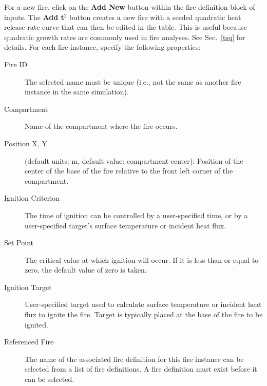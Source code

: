 {{For a new fire, click on the {\bf Add New} button within the fire definition block of inputs. The {\bf Add t$^2$} button creates a new fire with a seeded quadratic heat release rate curve that can then be edited in the table. This is useful because quadratic growth rates are commonly used in fire analyses. See Sec.~\ref{tsq} for details. For each fire instance, specify the following properties:
\begin{description}
\item[Fire ID] The selected name must be unique (i.e., not the same as another fire instance in the same simulation).
\item[Compartment] Name of the compartment where the fire occurs.
\item[Position X, Y] (default units: \unit{m}, default value: compartment center): Position of the center of the base of the fire relative to the front left corner of the compartment.
\item[Ignition Criterion] The time of ignition can be controlled by a user-specified time, or by a user-specified target's surface temperature or incident heat flux.
\item[Set Point] The critical value at which ignition will occur. If it is less than or equal to zero, the default value of zero is taken.
\item[Ignition Target] User-specified target used to calculate surface temperature or incident heat flux to ignite the fire. Target is typically placed at the base of the fire to be ignited.
\item[Referenced Fire] The name of the associated fire definition for this fire instance can be selected from a list of fire definitions. A fire definition must exist before it can be selected.
\end{description}

}}
